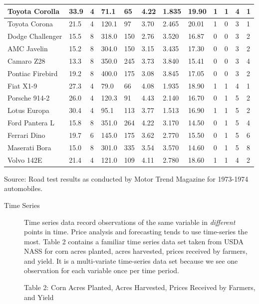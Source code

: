 \documentclass[]{book}
\theoremstyle{definition}
\theoremstyle{definition}
\theoremstyle{remark}
\begin{document}
\begin{tabular}{l|l|l|l|l|l|l|l|l|l|l|l}
\hline
Toyota Corolla & 33.9 & 4 & 71.1 & 65 & 4.22 & 1.835 & 19.90 & 1 & 1 & 4 & 1\\
\hline
Toyota Corona & 21.5 & 4 & 120.1 & 97 & 3.70 & 2.465 & 20.01 & 1 & 0 & 3 & 1\\
\hline
Dodge Challenger & 15.5 & 8 & 318.0 & 150 & 2.76 & 3.520 & 16.87 & 0 & 0 & 3 & 2\\
\hline
AMC Javelin & 15.2 & 8 & 304.0 & 150 & 3.15 & 3.435 & 17.30 & 0 & 0 & 3 & 2\\
\hline
Camaro Z28 & 13.3 & 8 & 350.0 & 245 & 3.73 & 3.840 & 15.41 & 0 & 0 & 3 & 4\\
\hline
Pontiac Firebird & 19.2 & 8 & 400.0 & 175 & 3.08 & 3.845 & 17.05 & 0 & 0 & 3 & 2\\
\hline
Fiat X1-9 & 27.3 & 4 & 79.0 & 66 & 4.08 & 1.935 & 18.90 & 1 & 1 & 4 & 1\\
\hline
Porsche 914-2 & 26.0 & 4 & 120.3 & 91 & 4.43 & 2.140 & 16.70 & 0 & 1 & 5 & 2\\
\hline
Lotus Europa & 30.4 & 4 & 95.1 & 113 & 3.77 & 1.513 & 16.90 & 1 & 1 & 5 & 2\\
\hline
Ford Pantera L & 15.8 & 8 & 351.0 & 264 & 4.22 & 3.170 & 14.50 & 0 & 1 & 5 & 4\\
\hline
Ferrari Dino & 19.7 & 6 & 145.0 & 175 & 3.62 & 2.770 & 15.50 & 0 & 1 & 5 & 6\\
\hline
Maserati Bora & 15.0 & 8 & 301.0 & 335 & 3.54 & 3.570 & 14.60 & 0 & 1 & 5 & 8\\
\hline
Volvo 142E & 21.4 & 4 & 121.0 & 109 & 4.11 & 2.780 & 18.60 & 1 & 1 & 4 & 2\\
\hline
\end{tabular}

Source: \citep{hocking1976biometrics} Road test results as conducted by
Motor Trend Magazine for 1973-1974 automobiles.

\begin{description}
\item[Time Series]
Time series data record observations of the same variable in
\emph{different} points in time. Price analysis and forecasting tends to
use time-series the most. Table 2 contains a familiar time series data
set taken from USDA NASS for corn acres planted, acres harvested, prices
received by farmers, and yield. It is a multi-variate time-series data
set because we see one observation for each variable once per time
period.

Table 2: Corn Acres Planted, Acres Harvested, Prices Received by
Farmers, and Yield
\end{description}
\end{document}
